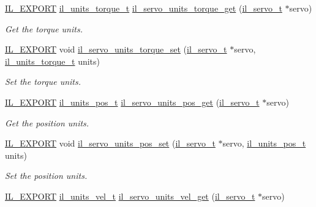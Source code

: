 \begin{DoxyCompactItemize}
\hyperlink{common_8h_a6bb629d26c52bfe10519ba3176853f47}{I\+L\+\_\+\+E\+X\+P\+O\+RT} \hyperlink{group__IL__SERVO_ga4fb6d5223f5364f40c8f5c8018a00124}{il\+\_\+units\+\_\+torque\+\_\+t} \hyperlink{group__IL__SERVO_gaf227fedcfd9602135cefd6bf240202c6}{il\+\_\+servo\+\_\+units\+\_\+torque\+\_\+get} (\hyperlink{group__IL__SERVO_ga3369ddfcc33492fe3a28f96cf455b13e}{il\+\_\+servo\+\_\+t} $\ast$servo)
\begin{DoxyCompactList}\small\item\em Get the torque units. \end{DoxyCompactList}\item 
\hyperlink{common_8h_a6bb629d26c52bfe10519ba3176853f47}{I\+L\+\_\+\+E\+X\+P\+O\+RT} void \hyperlink{group__IL__SERVO_gab5d0b378b678e0fd6d1a571eb90ab66f}{il\+\_\+servo\+\_\+units\+\_\+torque\+\_\+set} (\hyperlink{group__IL__SERVO_ga3369ddfcc33492fe3a28f96cf455b13e}{il\+\_\+servo\+\_\+t} $\ast$servo, \hyperlink{group__IL__SERVO_ga4fb6d5223f5364f40c8f5c8018a00124}{il\+\_\+units\+\_\+torque\+\_\+t} units)
\begin{DoxyCompactList}\small\item\em Set the torque units. \end{DoxyCompactList}\item 
\hyperlink{common_8h_a6bb629d26c52bfe10519ba3176853f47}{I\+L\+\_\+\+E\+X\+P\+O\+RT} \hyperlink{group__IL__SERVO_gaefeeab7931ae00097627941a79950799}{il\+\_\+units\+\_\+pos\+\_\+t} \hyperlink{group__IL__SERVO_gad561c34b2b3d7646e8cc9cb360e2f87e}{il\+\_\+servo\+\_\+units\+\_\+pos\+\_\+get} (\hyperlink{group__IL__SERVO_ga3369ddfcc33492fe3a28f96cf455b13e}{il\+\_\+servo\+\_\+t} $\ast$servo)
\begin{DoxyCompactList}\small\item\em Get the position units. \end{DoxyCompactList}\item 
\hyperlink{common_8h_a6bb629d26c52bfe10519ba3176853f47}{I\+L\+\_\+\+E\+X\+P\+O\+RT} void \hyperlink{group__IL__SERVO_ga1a64e31ed42e99bff4a577fc8b2ad076}{il\+\_\+servo\+\_\+units\+\_\+pos\+\_\+set} (\hyperlink{group__IL__SERVO_ga3369ddfcc33492fe3a28f96cf455b13e}{il\+\_\+servo\+\_\+t} $\ast$servo, \hyperlink{group__IL__SERVO_gaefeeab7931ae00097627941a79950799}{il\+\_\+units\+\_\+pos\+\_\+t} units)
\begin{DoxyCompactList}\small\item\em Set the position units. \end{DoxyCompactList}\item 
\hyperlink{common_8h_a6bb629d26c52bfe10519ba3176853f47}{I\+L\+\_\+\+E\+X\+P\+O\+RT} \hyperlink{group__IL__SERVO_ga548eebb728eb841e157b57f2063203ee}{il\+\_\+units\+\_\+vel\+\_\+t} \hyperlink{group__IL__SERVO_gaeb7615b200f236722ef98bf1b8b594c2}{il\+\_\+servo\+\_\+units\+\_\+vel\+\_\+get} (\hyperlink{group__IL__SERVO_ga3369ddfcc33492fe3a28f96cf455b13e}{il\+\_\+servo\+\_\+t} $\ast$servo)

\end{DoxyCompactItemize}
